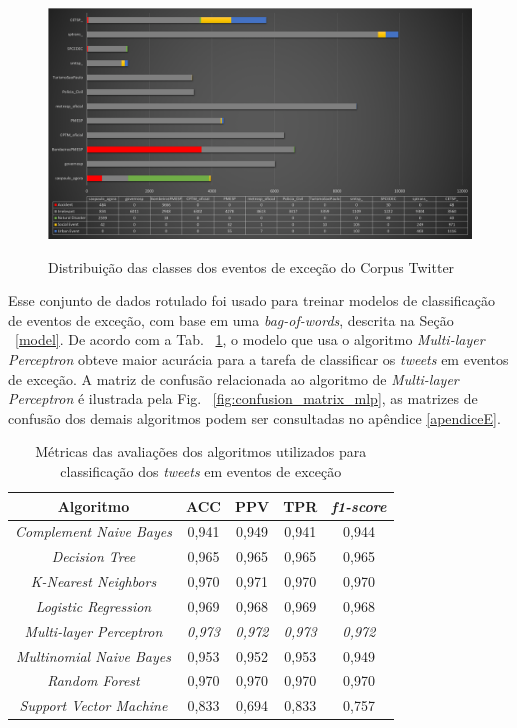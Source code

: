 \documentclass[
	12pt,				%
	oneside,			%
	a4paper,			%
	english,			%
	brazil				%
	]{abntex2ppgsi}
\begin{document}
{{\begin{figure}[!htb]
	\centering
 	  \caption{Distribuição das classes dos eventos de exceção do Corpus Twitter}
		\includegraphics[width=1\linewidth]{images/tweets_distribution.png}
	\label{fig:tweets_distribution}
\end{figure}

Esse conjunto de dados rotulado foi usado para treinar modelos de classificação de eventos de exceção, com base em uma \textit{bag-of-words}, descrita na Seção ~\ref{model}. De acordo com a Tab. ~\ref{tab:metrics}, o modelo que usa o algoritmo \textit{Multi-layer Perceptron} obteve maior acurácia para a tarefa de classificar os \textit{tweets} em eventos de exceção. A matriz de confusão relacionada ao algoritmo de \textit{Multi-layer Perceptron} é ilustrada pela Fig. ~\ref{fig:confusion_matrix_mlp}, as matrizes de confusão dos demais algoritmos podem ser consultadas no apêndice \ref{apendiceE}.

\begin{table}[!htb]
\centering
\caption {Métricas das avaliações dos algoritmos utilizados para classificação dos \textit{tweets} em eventos de exceção}
\label {tab:metrics}
\begin{tabular}{c|c|c|c|c}
\toprule
\textbf{Algoritmo} & \textbf{ACC} & \textbf{PPV} & \textbf{TPR} & \textbf{\textit{f1-score}} \\
\midrule
\textit{Complement Naive Bayes} & 0,941 & 0,949 & 0,941 & 0,944 \\
\hline
\textit{Decision Tree} & 0,965 & 0,965 & 0,965 & 0,965 \\
\hline
\textit{K-Nearest Neighbors} & 0,970 & 0,971 & 0,970 & 0,970 \\
\hline
\textit{Logistic Regression} & 0,969 & 0,968 & 0,969 & 0,968 \\
\hline
\textit{Multi-layer Perceptron} & \textit{0,973} & \textit{0,972} & \textit{0,973} & \textit{0,972} \\
\hline
\textit{Multinomial Naive Bayes} & 0,953 & 0,952 & 0,953 & 0,949 \\
\hline
\textit{Random Forest} & 0,970 & 0,970 & 0,970 & 0,970 \\
\hline
\textit{Support Vector Machine} & 0,833 & 0,694 & 0,833 & 0,757 \\
\bottomrule
\end{tabular}\end{table}


}}
\end{document}
